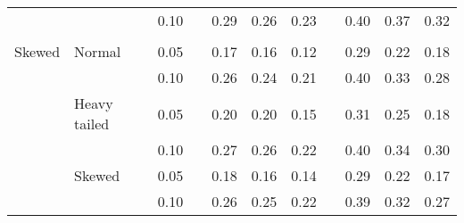 \begin{table}[ht]
\begin{scriptsize}
\begin{center}
\begin{tabular}{ll p{.1cm} c p{.1cm} rrr p{.1cm} rrr}
             &              && 0.10 &&  0.29 & 0.26 & 0.23 && 0.40 & 0.37 & 0.32 \\ 
             &&&&&&&&&&&\\
Skewed       & Normal       && 0.05 &&  0.17 & 0.16 & 0.12 && 0.29 & 0.22 & 0.18 \\ 
             &              && 0.10 &&  0.26 & 0.24 & 0.21 && 0.40 & 0.33 & 0.28 \\ 
             & Heavy tailed && 0.05 &&  0.20 & 0.20 & 0.15 && 0.31 & 0.25 & 0.18 \\ 
             &              && 0.10 &&  0.27 & 0.26 & 0.22 && 0.40 & 0.34 & 0.30 \\ 
             & Skewed       && 0.05 &&  0.18 & 0.16 & 0.14 && 0.29 & 0.22 & 0.17 \\ 
             &              && 0.10 &&  0.26 & 0.25 & 0.22 && 0.39 & 0.32 & 0.27 \\ 

\hline
\end{tabular}
\end{center}
\end{scriptsize}
\end{table}

